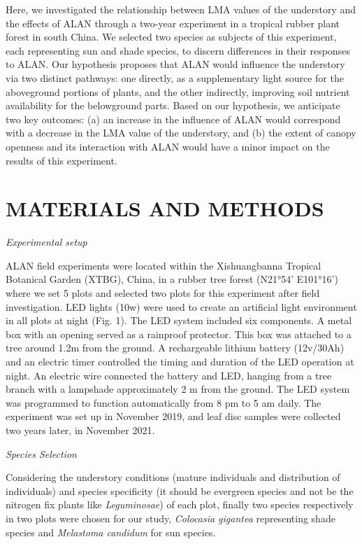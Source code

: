 \documentclass[
  12pt,
  letterpaper,
  DIV=11,
  numbers=noendperiod]{scrartcl}
\begin{document}
Here, we investigated the relationship between LMA values of the
understory and the effects of ALAN through a two-year experiment in a
tropical rubber plant forest in south China. We selected two species as
subjects of this experiment, each representing sun and shade species, to
discern differences in their responses to ALAN. Our hypothesis proposes
that ALAN would influence the understory via two distinct pathways: one
directly, as a supplementary light source for the aboveground portions
of plants, and the other indirectly, improving soil nutrient
availability for the belowground parts. Based on our hypothesis, we
anticipate two key outcomes: (a) an increase in the influence of ALAN
would correspond with a decrease in the LMA value of the understory, and
(b) the extent of canopy openness and its interaction with ALAN would
have a minor impact on the results of this experiment.

\hypertarget{materials-and-methods}{%
\section{MATERIALS AND METHODS}\label{materials-and-methods}}

\emph{Experimental setup}

ALAN field experiments were located within the Xishuangbanna Tropical
Botanical Garden (XTBG), China, in a rubber tree forest (N21°54'
E101°16') where we set 5 plots and selected two plots for this
experiment after field investigation. LED lights (10w) were used to
create an artificial light environment in all plots at night (Fig. 1).
The LED system included six components. A metal box with an opening
served as a rainproof protector. This box was attached to a tree around
1.2m from the ground. A rechargeable lithium battery (12v/30Ah) and an
electric timer controlled the timing and duration of the LED operation
at night. An electric wire connected the battery and LED, hanging from a
tree branch with a lampshade approximately 2 m from the ground. The LED
system was programmed to function automatically from 8 pm to 5 am daily.
The experiment was set up in November 2019, and leaf disc samples were
collected two years later, in November 2021.

\emph{Species Selection}

Considering the understory conditions (mature individuals and
distribution of individuals) and species specificity (it should be
evergreen species and not be the nitrogen fix plants like
\emph{Leguminosae}) of each plot, finally two species respectively in
two plots were chosen for our study, \emph{Colocasia gigantea}
representing shade species and \emph{Melastoma candidum} for sun
species.
\end{document}
